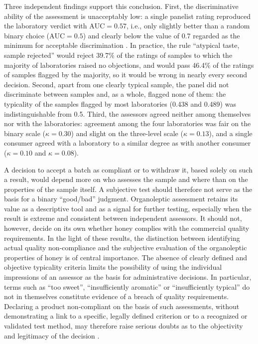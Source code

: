 Three independent findings support this conclusion. First, the discriminative
ability of the assessment is unacceptably low: a single panelist rating
reproduced the laboratory verdict with $\mathrm{AUC} = 0.57$, i.e., only
slightly better than a random binary choice ($\mathrm{AUC} = 0.5$) and clearly
below the value of 0.7 regarded as the minimum for acceptable discrimination
\cite{Hosmer2013}. In practice, the rule ``atypical taste, sample rejected''
would reject 39.7\% of the ratings of samples to which the majority of
laboratories raised no objections, and would pass 46.4\% of the ratings of
samples flagged by the majority, so it would be wrong in nearly every second
decision. Second, apart from one clearly typical sample, the panel did not
discriminate between samples and, as a whole, flagged none of them: the
typicality of the samples flagged by most laboratories (0.438 and 0.489) was
indistinguishable from 0.5. Third, the assessors agreed neither among
themselves nor with the laboratories: agreement among the four laboratories was
fair on the binary scale ($\kappa = 0.30$) and slight on the three-level scale
($\kappa = 0.13$), and a single consumer agreed with a laboratory to a similar
degree as with another consumer ($\kappa = 0.10$ and $\kappa = 0.08$).

A decision to accept a batch as compliant or to withdraw it, based solely on
such a result, would depend more on who assesses the sample and where than on
the properties of the sample itself. A subjective test should therefore not
serve as the basis for a binary ``good/bad'' judgment. Organoleptic assessment
retains its value as a descriptive tool and as a signal for further testing,
especially when the result is extreme and consistent between independent
assessors. It should not, however, decide on its own whether honey complies
with the commercial quality requirements. In the light of these results, the
distinction between identifying actual quality non-compliance and the
subjective evaluation of the organoleptic properties of honey is of central
importance. The absence of clearly defined and objective typicality criteria
limits the possibility of using the individual impressions of an assessor as
the basis for administrative decisions. In particular, terms such as ``too
sweet'', ``insufficiently aromatic'' or ``insufficiently typical'' do not in
themselves constitute evidence of a breach of quality requirements. Declaring
a product non-compliant on the basis of such assessments, without
demonstrating a link to a specific, legally defined criterion or to a
recognized or validated test method, may therefore raise serious doubts as to
the objectivity and legitimacy of the decision
\cite[Art.~34]{Rozporzadzenie2017625}.
